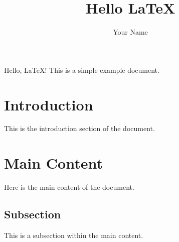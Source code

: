 \documentclass{article}
\begin{document}
\title{Hello LaTeX}
\author{Your Name}
\maketitle

Hello, \LaTeX! This is a simple example document.

\section{Introduction}
This is the introduction section of the document.

\section{Main Content}
Here is the main content of the document.

\subsection{Subsection}
This is a subsection within the main content.
\end{document}

